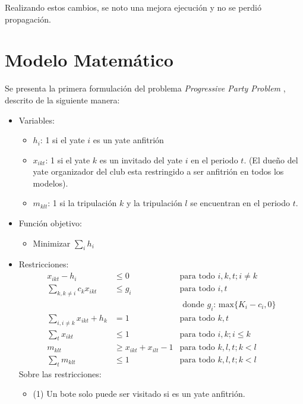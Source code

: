 \documentclass[letter, 10pt]{article}
\begin{document}
Realizando estos cambios, se noto una mejora ejecución y no se perdió propagación.

\section{Modelo Matemático}
Se presenta la primera formulación del problema \textit{Progressive Party Problem }, descrito de la siguiente manera:

\begin{itemize}
    \item Variables:
    \begin{itemize}
        \item $h_i$: 1 si el yate $i$ es un yate anfitrión
        \item $x_{ikt}$: 1 si el yate $k$ es un invitado del yate $i$ en el periodo $t$. (El dueño del yate organizador del club esta restringido a ser anfitrión en todos los modelos).
        \item $m_{klt}$: 1 si la tripulación $k$ y la tripulación $l$ se encuentran en el periodo $t$.
    \end{itemize}
    \item Función objetivo:
    \begin{itemize}
        \item Minimizar $\displaystyle \sum_{i} h_i$
    \end{itemize}
    \item Restricciones:
    \begin{align}
        \displaystyle x_{ikt} - h_i &\leq 0           & \text{para todo } i,k,t;i\neq k  \\ 
        \displaystyle \sum_{k,k\neq i} c_k x_{ikt} & \leq g_i & \text{para todo } i,t \\
        & & \text{ donde } g_i  \text{: max} \{K_i - c_i,0 \} \\
        \displaystyle \sum_{i,i\neq k} x_{ikt} + h_k &= 1            & \text{para todo }k,t \\
        \displaystyle \sum_{t} x_{ikt} &\leq 1            & \text{para todo } i,k;i \leq k \\
        \displaystyle m_{klt} &\geq x_{ikt} + x_{ilt} -1           & \text{para todo } k,l,t; k<l \\
        \displaystyle \sum_{t} m_{klt} &\leq 1 & \text{para todo } k,l,t; k<l
    \end{align}
    Sobre las restricciones:
    \begin{itemize}
        \item (1) Un bote solo puede ser visitado si es un yate anfitrión.

\end{itemize}
\end{itemize}
\end{document}
